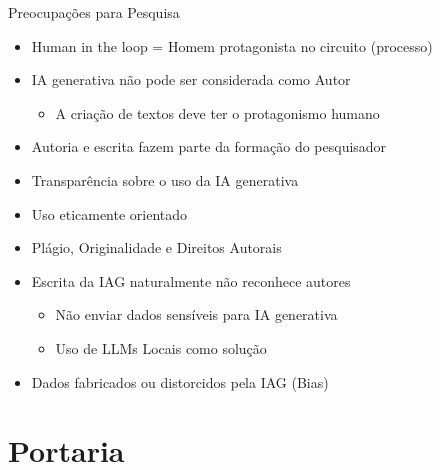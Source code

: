 \documentclass[aspectratio=169]{beamer}
\begin{document}
\begin{frame}{Preocupações para Pesquisa}
  \centering
  \begin{itemize}
	  \item Human in the loop = Homem protagonista no circuito (processo)
	  \item IA generativa não pode ser considerada como Autor
	  \begin{itemize}
	  	\item A criação de textos deve ter o protagonismo humano
	  \end{itemize}
	  \item Autoria e escrita fazem parte da formação do pesquisador
	  \item Transparência sobre o uso da IA generativa
	  \item Uso eticamente orientado
	  \item Plágio, Originalidade e Direitos Autorais
    \item Escrita da IAG naturalmente não reconhece autores
    \begin{itemize}
        \item Não enviar dados sensíveis para IA generativa
        \item Uso de LLMs Locais como solução
    \end{itemize}
    \item Dados fabricados ou distorcidos pela IAG (Bias)
  \end{itemize}
\end{frame}

\section{Portaria}
\end{document}
